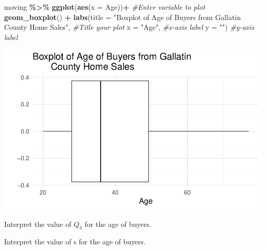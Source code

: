 \documentclass[
]{report}
\newenvironment{Shaded}{\begin{snugshade}}{\end{snugshade}}
\newcommand{\AttributeTok}[1]{\textcolor[rgb]{0.13,0.29,0.53}{#1}}
\newcommand{\CommentTok}[1]{\textcolor[rgb]{0.56,0.35,0.01}{\textit{#1}}}
\newcommand{\FunctionTok}[1]{\textcolor[rgb]{0.13,0.29,0.53}{\textbf{#1}}}
\newcommand{\NormalTok}[1]{#1}
\newcommand{\SpecialCharTok}[1]{\textcolor[rgb]{0.81,0.36,0.00}{\textbf{#1}}}
\newcommand{\StringTok}[1]{\textcolor[rgb]{0.31,0.60,0.02}{#1}}
\begin{document}
\begin{Shaded}
\begin{Highlighting}[]
\NormalTok{moving }\SpecialCharTok{\%\textgreater{}\%}
  \FunctionTok{ggplot}\NormalTok{(}\FunctionTok{aes}\NormalTok{(}\AttributeTok{x =}\NormalTok{ Age))}\SpecialCharTok{+} \CommentTok{\#Enter variable to plot}
  \FunctionTok{geom\_boxplot}\NormalTok{() }\SpecialCharTok{+} 
  \FunctionTok{labs}\NormalTok{(}\AttributeTok{title =} \StringTok{"Boxplot of Age of Buyers from Gallatin }
\StringTok{       County Home Sales"}\NormalTok{, }\CommentTok{\#Title your plot}
       \AttributeTok{x =} \StringTok{"Age"}\NormalTok{, }\CommentTok{\#x{-}axis label}
       \AttributeTok{y =} \StringTok{""}\NormalTok{) }\CommentTok{\#y{-}axis label}
\end{Highlighting}
\end{Shaded}

\begin{center}\includegraphics[width=0.7\linewidth]{03-LN03-EDA_files/figure-latex/unnamed-chunk-17-1} \end{center}

\begin{Shaded}
\end{Shaded}

Interpret the value of \(Q_3\) for the age of buyers.

\vspace{0.5in}

Interpret the value of s for the age of buyers.

\vspace{0.5in}
\end{document}
